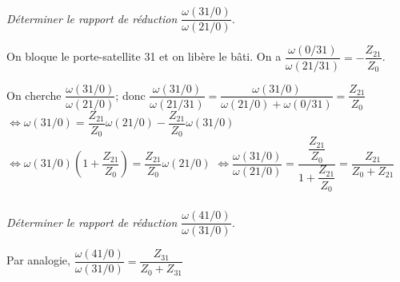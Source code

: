 \documentclass[10pt,fleqn]{article} %
\begin{document}
\begin{multicols}{2}
\fi



\subparagraph{}
\textit{Déterminer le rapport de réduction $\dfrac{\omega(31/0)}{\omega(21/0)}$.}
\ifprof
\begin{corrige}
On bloque le porte-satellite 31 et on libère le bâti. On a $\dfrac{\omega(0/31)}{\omega(21/31)}=-\dfrac{Z_{21}}{Z_0}$.

On cherche 
$\dfrac{\omega(31/0)}{\omega(21/0)}$; donc $\dfrac{\omega(31/0)}{\omega(21/31)}=\dfrac{\omega(31/0)}{\omega(21/0)+\omega(0/31)}=\dfrac{Z_{21}}{Z_0}$
$\Leftrightarrow \omega(31/0)=\dfrac{Z_{21}}{Z_0}\omega(21/0)-\dfrac{Z_{21}}{Z_0}\omega(31/0)$
$\Leftrightarrow \omega(31/0)\left(1+\dfrac{Z_{21}}{Z_0}\right)=\dfrac{Z_{21}}{Z_0}\omega(21/0)$
$\Leftrightarrow \dfrac{\omega(31/0)}{\omega(21/0)}=\dfrac{\dfrac{Z_{21}}{Z_0}}{1+\dfrac{Z_{21}}{Z_0}}=\dfrac{Z_{21}}{Z_{0}+Z_{21}}$
\end{corrige}
\else
\fi

\subparagraph{}
\textit{Déterminer le rapport de réduction $\dfrac{\omega(41/0)}{\omega(31/0)}$.}
\ifprof
\begin{corrige}
Par analogie, 
$\dfrac{\omega(41/0)}{\omega(31/0)}=\dfrac{Z_{31}}{Z_{0}+Z_{31}}$
\end{corrige}
\else
\fi



\end{multicols}
\end{document}
